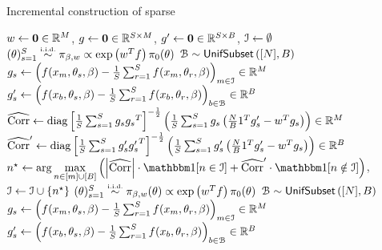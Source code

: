 \begin{algorithm*}[!t]
	\caption{Incremental construction of sparse \bpost{}}
	\label{alg:bcores}
	\begin{algorithmic}[1]
		\State $w \leftarrow \mathbf{0} \in \mathbb{R}^{M}$,\;\; $g \leftarrow \mathbf{0} \in \mathbb{R}^{S \times M}$, \;\;$g' \leftarrow \mathbf{0} \in \mathbb{R}^{S \times B}$, \;\;$\mathcal{I} \leftarrow \emptyset$
		\State $(\theta)_{s=1}^{S}  \distiid \pi_{\beta,w} \propto \exp \left(w^Tf\right) \pi_0(\theta)$
		\State $\mathcal{B}\sim{\sf{UnifSubset}}\left([N], B\right)$
		\State $g_{s} \gets \left( f(x_m, \theta_s, \beta ) - \frac{1}{S}\sum_{r=1}^S f(x_m, \theta_{r}, \beta) \right)_{m \in \mathcal{I}}\in \mathbb{R}^M$ 
		\State  $g'_{s} \gets \left( f(x_b, \theta_s, \beta) - \frac{1}{S}\sum_{r=1}^S f(x_b, \theta_{r}, \beta) \right)_{b\in\mathcal{B}} \in \mathbb{R}^B$
		\State $\widehat{\operatorname{Corr}} \leftarrow \operatorname{diag} \left[ \frac{1}{S} \sum_{s=1}^{S} g_{s}
		{g_{s}}^T\right]^{-\frac{1}{2}} \left(\frac{1}{S} \sum_{s=1}^{S} g_{s} \left(\frac{N}{B}1^T g'_{s} - w^T g_{s}\right)\right) \in \mathbb{R}^{M}$
		\label{lst:line:core-corr}
		\State $\widehat{\operatorname{Corr}}' \leftarrow \operatorname{diag} \left[ \frac{1}{S} \sum_{s=1}^{S} g'_{s}
		{g'_{s}}^T\right]^{-\frac{1}{2}} \left(\frac{1}{S} \sum_{s=1}^{S} g'_{s} \left(\frac{N}{B}1^T g'_{s} - w^T g_{s}\right)\right)  \in \mathbb{R}^{B}$
		\label{lst:line:batch-corr}
		\State $n^{\star} \assign \arg \underset{n \in [m] \cup [B]}{\max} \left( \left|\hcorr \right| \cdot \vecone[n \in \mcI] + \hcorr' \cdot \vecone [n \notin \mcI]\right)$, \;\;$ \mathcal{I} \leftarrow \mathcal{I} \cup \{n^{\star}\}$
		 		
		\State $(\theta)_{s=1}^{S}  \distiid \pi_{\beta,w}(\theta) \propto \exp\left(w^T f\right)\pi_0(\theta)$ 
		\State $\mathcal{B}\sim{\sf{UnifSubset}}\left([N], B\right)$
		\State $g_{s} \gets \left( f(x_m, \theta_s, \beta) - \frac{1}{S}\sum_{r=1}^S f(x_m, \theta_{r}, \beta) \right)_{m\in\mathcal{I}} \in \mathbb{R}^M$  
		\State $g'_{s} \gets \left( f(x_b, \theta_s, \beta) - \frac{1}{S}\sum_{r=1}^S f(x_b, \theta_{r}, \beta) \right)_{b\in\mathcal{B}} \in \mathbb{R}^B$  	

\end{algorithmic}
\end{algorithm*}
